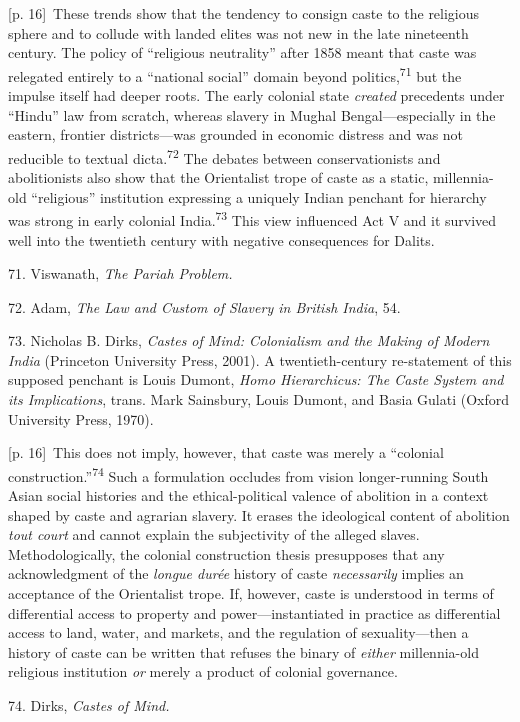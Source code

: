 \documentclass[10pt,a4paper]{article}
\begin{document}
{\scriptsize\color{gray} [p. 16]}\ These trends show that the tendency to consign caste to the religious sphere and to collude with landed elites was not new in the late nineteenth century. The policy of “religious neutrality” after 1858 meant that caste was relegated entirely to a “national social” domain beyond politics,\nobreak\textsuperscript{71} but the impulse itself had deeper roots. The early colonial state \textit{created} precedents under “Hindu” law from scratch, whereas slavery in Mughal Bengal—especially in the eastern, frontier districts—was grounded in economic distress and was not reducible to textual dicta.\nobreak\textsuperscript{72} The debates between conservationists and abolitionists also show that the Orientalist trope of caste as a static, millennia-old “religious” institution expressing a uniquely Indian penchant for hierarchy was strong in early colonial India.\nobreak\textsuperscript{73} This view influenced Act V and it survived well into the twentieth century with negative consequences for Dalits.\par{\small 71. Viswanath, \textit{The Pariah Problem.}\par}{\small 72. Adam, \textit{The Law and Custom of Slavery in British India}, 54.\par}{\small 73. Nicholas B. Dirks, \textit{Castes of Mind: Colonialism and the Making of Modern India} (Princeton University Press, 2001). A twentieth-century re-statement of this supposed penchant is Louis Dumont, \textit{Homo Hierarchicus: The Caste System and its Implications}, trans. Mark Sainsbury, Louis Dumont, and Basia Gulati (Oxford University Press, 1970).\par}
{\scriptsize\color{gray} [p. 16]}\ This does not imply, however, that caste was merely a “colonial construction.”\nobreak\textsuperscript{74} Such a formulation occludes from vision longer-running South Asian social histories and the ethical-political valence of abolition in a context shaped by caste and agrarian slavery. It erases the ideological content of abolition \textit{tout court} and cannot explain the subjectivity of the alleged slaves. Methodologically, the colonial construction thesis presupposes that any acknowledgment of the \textit{longue durée} history of caste \textit{necessarily} implies an acceptance of the Orientalist trope. If, however, caste is understood in terms of differential access to property and power—instantiated in practice as differential access to land, water, and markets, and the regulation of sexuality—then a history of caste can be written that refuses the binary of \textit{either} millennia-old religious institution \textit{or} merely a product of colonial governance.\par{\small 74. Dirks, \textit{Castes of Mind.}\par}
\end{document}
